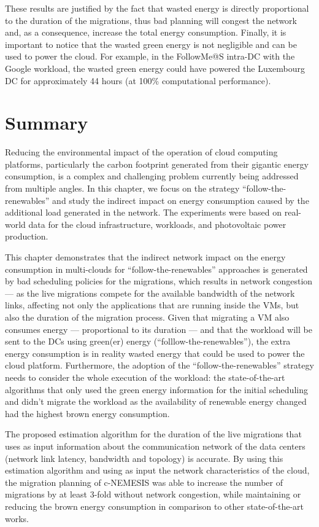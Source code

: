 These results are justified by the fact that wasted energy is directly proportional to the duration of the migrations, thus bad planning will congest the network and, as a consequence, increase the total energy consumption. Finally, it is important to notice that the wasted green energy is not negligible and can be used to power the cloud. For example, in the FollowMe@S intra-DC with the Google workload, the wasted green energy could have powered the Luxembourg DC for approximately 44 hours (at 100\% computational performance).


\section{Summary} \label{sec:conclusion_smargreens}


Reducing the environmental impact of the operation of cloud computing platforms, particularly the carbon footprint generated from their gigantic energy consumption, is a complex and challenging problem currently being addressed from multiple angles. In this chapter, we focus on the strategy ``follow-the-renewables'' and study the indirect impact on energy consumption caused by the additional load generated in the network. The experiments were based on real-world data for the cloud infrastructure, workloads, and photovoltaic power production.

This chapter demonstrates that the indirect network impact on the energy consumption in multi-clouds for ``follow-the-renewables'' approaches is generated by bad scheduling policies for the migrations, which results in network congestion --- as the live migrations compete for the available bandwidth of the network links, affecting not only the applications that are running inside the VMs, but also the duration of the migration process. Given that migrating a VM also consumes energy --- proportional to its duration --- and that the workload will be sent to the DCs using green(er) energy (``folllow-the-renewables''), the extra energy consumption is in reality wasted energy that could be used to power the cloud platform. Furthermore, the adoption of the ``follow-the-renewables'' strategy needs to consider the whole execution of the workload:  the state-of-the-art algorithms that only used the green energy information for the initial scheduling and didn't migrate the workload as the availability of renewable energy changed had the highest brown energy consumption.

The proposed estimation algorithm for the duration of the live migrations that uses as input information about the communication network of the data centers (network link latency, bandwidth and topology) is accurate. By using this estimation algorithm and using as input the network characteristics of the cloud, the migration planning of c-NEMESIS was able to increase the number of migrations by at least 3-fold without network congestion, while maintaining or reducing the brown energy consumption in comparison to other state-of-the-art works.

